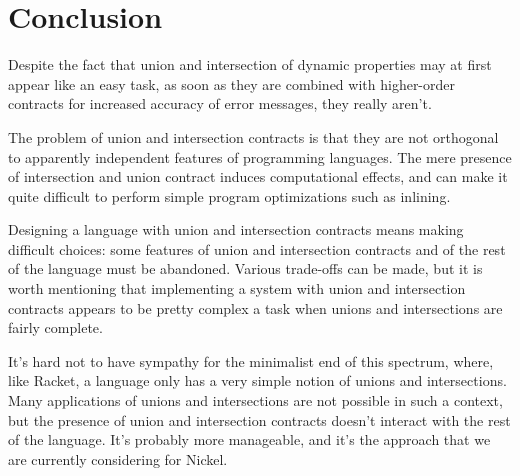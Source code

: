 \documentclass[sigplan,screen,10pt]{acmart}
\begin{document}





\section{Conclusion}
\label{sec:conclusion}

Despite the fact that union and intersection of dynamic properties may
at first appear like an easy task, as soon as they are combined with
higher-order contracts for increased accuracy of error messages, they
really aren't.

The problem of union and intersection contracts is that they are not
orthogonal to apparently independent features of programming
languages. The mere presence of intersection and union contract
induces computational effects, and can make it quite difficult to
perform simple program optimizations such as inlining.

Designing a language with union and intersection contracts means
making difficult choices: some features of union and intersection
contracts and of the rest of the language must be abandoned. Various
trade-offs can be made, but it is worth mentioning that implementing a
system with union and intersection contracts appears to be pretty
complex a task when unions and intersections are fairly complete.

It's hard not to have sympathy for the minimalist end of this
spectrum, where, like Racket, a language only has a very simple notion
of unions and intersections. Many applications of unions and
intersections are not possible in such a context, but the presence of
union and intersection contracts doesn't interact with the rest of the
language. It's probably more manageable, and it's the approach that
we are currently considering for Nickel.
\end{document}
